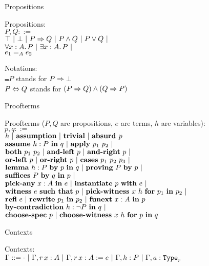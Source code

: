 \begin{frame}{Propositions}

Propositions: \\
$P, Q ::=$ \\
\qquad $\top \ |\  \bot \ |\  P \Rightarrow Q \ |\  P \land Q \ |\  P \lor Q \ |\ $ \\
\qquad $\All{x}[A]{P} \pipe \Ex{x}[A]{P} \pipe$ \\
\qquad $\Eq[A]{e_1}{e_2}$

\vspace{2em}

Notations: \\
$\Not{P}$ stands for $P \Rightarrow \bot$ \\
$P \Leftrightarrow Q$ stands for $(P \Rightarrow Q) \land (Q \Rightarrow P)$

\end{frame}

\begin{frame}{Proofterms}

Proofterms ($P, Q$ are propositions, $e$ are terms, $h$ are variables): \\
$p, q ::=$ \\
\qquad $h \pipe \assumption \pipe \trueintro \pipe \falseelim{p}$ \\
\qquad $\implintro{h}[P]{q} \pipe \implelim{p_1}{p_2} \pipe$ \\
\qquad $\textbf{both}\ p_1\ p_2 \ |\  \textbf{and-left}\ p \ |\  \textbf{and-right}\ p \ |\ $ \\
\qquad $\textbf{or-left}\ p \ |\  \textbf{or-right}\ p \ |\  \textbf{cases}\ p_1\ p_2\ p_3 \ |\ $ \\
\qquad $\textbf{lemma}\ h : P\ \textbf{by}\ p\ \textbf{in}\ q \ |\  \textbf{proving}\ P\ \textbf{by}\ p \ |\ $ \\
\qquad $\textbf{suffices}\ P\ \textbf{by}\ q\ \textbf{in}\ p \ |\ $ \\
\qquad $\allintro{x}[A]{e} \pipe \allelim{p}{e} \pipe$ \\
\qquad $\textbf{witness}\ e\ \textbf{such that}\ p \ |\  \textbf{pick-witness}\ x\ h\ \textbf{for}\ p_1\ \textbf{in}\ p_2 \ |\ $ \\
\qquad $\refl[e] \pipe \rewrite{p_1}{p_2} \pipe \funext{x}[A]{p}$ \\
\qquad $\bycontradiction{h}[P]{q} \pipe$ \\
\qquad $\textbf{choose-spec}\ p \ |\  \textbf{choose-witness}\ x\ h\ \textbf{for}\ p\ \textbf{in}\ q$

\end{frame}

\begin{frame}{Contexts}

Contexts: \\
$\Gamma ::= \emptyctx \pipe \extend{\Gamma}[r]{x}{A} \pipe \extend{\Gamma}[r]{x}{A}[e] \pipe \assume{\Gamma}{h}{P} \pipe \extendtype{\Gamma}{a}[r]$

\end{frame}

